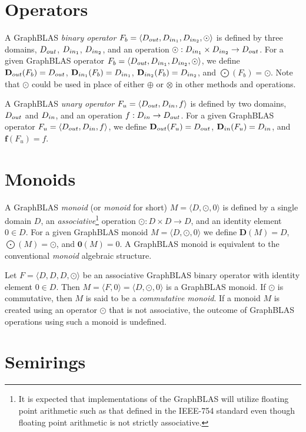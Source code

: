\section{Operators}

A GraphBLAS \emph{binary operator} $F_b = \langle \mbox{$D_{out}$}, \mbox{$D_{in_{1}}$}, \mbox{$D_{in_{2}}$}, 
\odot \rangle$
is defined by three domains, $\mbox{$D_{out}$}$, $\mbox{$D_{in_{1}}$}$, $\mbox{$D_{in_{2}}$}$, and an operation
$\odot: \mbox{$D_{in_{1}}$} \times \mbox{$D_{in_{2}}$} \rightarrow \mbox{$D_{out}$}$.  For a given GraphBLAS operator
$F_b=\langle \mbox{$D_{out}$}, \mbox{$D_{in_{1}}$}, \mbox{$D_{in_{2}}$}, \odot \rangle$, we define $\mbox{$\mathbf{D}_{out}$}(F_b) = \mbox{$D_{out}$}$,
$\mbox{$\mathbf{D}_{in_{1}}$}(F_b) = \mbox{$D_{in_{1}}$}$, $\mbox{$\mathbf{D}_{in_{2}}$}(F_b) = \mbox{$D_{in_{2}}$}$, and $\mathbf{\bigodot}(F_b)
= \odot$.  Note that $\odot$ could be used in place of either $\oplus$ or 
$\otimes$ in other methods and operations.

A GraphBLAS \emph{unary operator} $F_u = \langle \mbox{$D_{out}$}, \mbox{$D_{in}$}, f\rangle$
is defined by two domains, $\mbox{$D_{out}$}$ and $\mbox{$D_{in}$}$, and an operation
$f: \mbox{$D_{in}$} \rightarrow \mbox{$D_{out}$}$.  For a given GraphBLAS operator
$F_u=\langle \mbox{$D_{out}$}, \mbox{$D_{in}$}, f \rangle$, we define $\mbox{$\mathbf{D}_{out}$}(F_u) = \mbox{$D_{out}$}$, 
$\mbox{$\mathbf{D}_{in}$}(F_u) = \mbox{$D_{in}$}$, and $\mathbf{f}(F_u) = f$.

\section{Monoids}

A GraphBLAS \emph{monoid} (or \emph{monoid} for short) $M =
\langle D,\odot,0 \rangle$ is defined by a single domain $D$, an 
\emph{associative}\footnote{\label{Foot:associative}It is expected 
that implementations of the GraphBLAS will utilize floating point arithmetic 
such as that defined in the IEEE-754 standard even though
floating point arithmetic is not strictly associative.} 
operation $\odot: D \times D \rightarrow D$,
and an identity element $0 \in D$.  For a given GraphBLAS monoid $M=\langle
D,\odot,0 \rangle$ we define $\mathbf{D}(M) = D$, $\mathbf{\bigodot}(M) =
\odot$, and $\mathbf{0}(M) = 0$.  A GraphBLAS monoid is equivalent to 
the conventional \emph{monoid} algebraic structure.

Let $F = \langle D,D,D,\odot \rangle$ be an associative GraphBLAS binary operator
with identity element $0 \in D$.  Then $M = \langle F,0 \rangle = \langle
D,\odot,0 \rangle$ is a GraphBLAS monoid. If $\odot$ is commutative,
then $M$ is said to be a \emph{commutative monoid}.
If a monoid $M$ is created using an operator $\odot$ that is
not associative, the outcome of GraphBLAS operations using such a monoid is undefined.

\section{Semirings}

